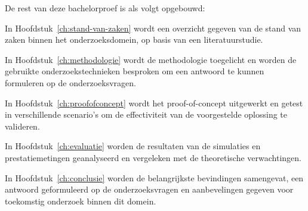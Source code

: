 
De rest van deze bachelorproef is als volgt opgebouwd:

In Hoofdstuk~\ref{ch:stand-van-zaken} wordt een overzicht gegeven van de stand van zaken binnen het onderzoeksdomein, op basis van een literatuurstudie.

In Hoofdstuk~\ref{ch:methodologie} wordt de methodologie toegelicht en worden de gebruikte onderzoekstechnieken besproken om een antwoord te kunnen formuleren op de onderzoeksvragen.

In Hoofdstuk~\ref{ch:proofofconcept} wordt het proof-of-concept uitgewerkt en getest in verschillende scenario’s om de effectiviteit van de voorgestelde oplossing te valideren.

In Hoofdstuk~\ref{ch:evaluatie} worden de resultaten van de simulaties en prestatiemetingen geanalyseerd en vergeleken met de theoretische verwachtingen.

In Hoofdstuk~\ref{ch:conclusie} worden de belangrijkste bevindingen samengevat, een antwoord geformuleerd op de onderzoeksvragen en aanbevelingen gegeven voor toekomstig onderzoek binnen dit domein.